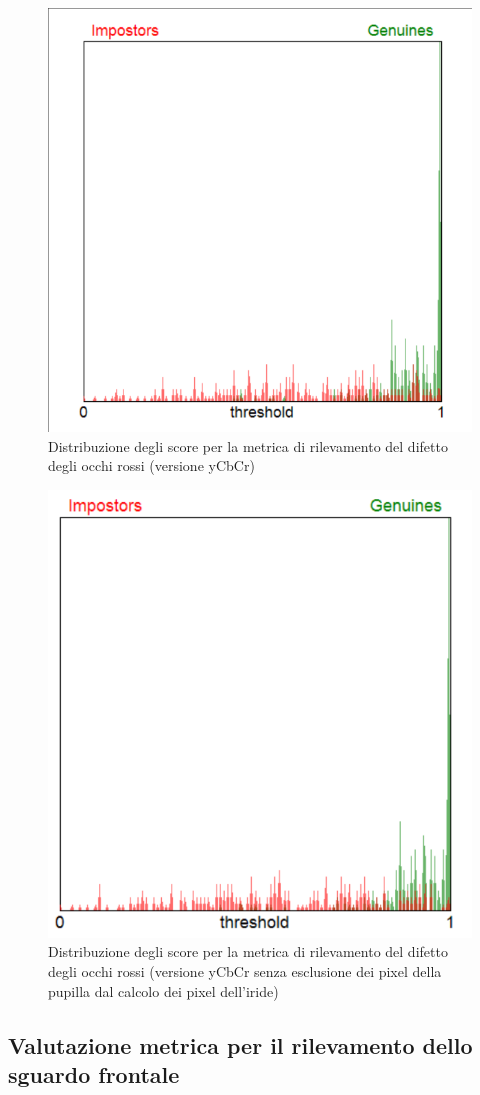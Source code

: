 \documentclass[12pt,a4paper,openright,twoside]{book}
\begin{document}
\begin{figure}
    \centering
    \includegraphics[width=.6\linewidth]{figures/score-distribution-red-eye-with-ycbcr.png}
    \caption{Distribuzione degli score per la metrica di rilevamento del difetto degli occhi rossi (versione yCbCr)}
    \label{fig:score_distribution_red_eye_with_ycbcr}
\end{figure}

\begin{figure}
    \centering
    \includegraphics[width=.6\linewidth]{figures/score-distribution-red-eye-with-ycbcr-no-pupill.png}
    \caption{Distribuzione degli score per la metrica di rilevamento del difetto degli occhi rossi (versione yCbCr senza esclusione dei pixel della pupilla dal calcolo dei pixel dell'iride)}
    \label{fig:score_distribution_red_eye_with_ycbcr_no_pupill}
\end{figure}

\subsection{Valutazione metrica per il rilevamento dello sguardo frontale}
\end{document}
